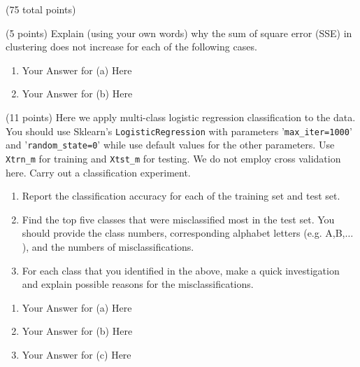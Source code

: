 \documentclass[12pt]{article}
\begin{document}
\begin{question}{(75 total points) \qTwoTitle}
\begin{subquestion}{(5 points)
    Explain (using your own words) why the sum of square error (SSE) in \kmeans clustering does not increase for each of the following cases.
  }
  \begin{answerbox}{0.55\textheight}
    \begin{enumerate}
    \item Your Answer for (a) Here
    \item Your Answer for (b) Here
    \end{enumerate}
  \end{answerbox}
  


\end{subquestion}

\begin{subquestion}{(11 points)
    Here we apply multi-class logistic regression classification to the data. You should use Sklearn's {\tt LogisticRegression} with parameters '{\tt max\_iter=1000}' and '{\tt random\_state=0}' while use default values for the other parameters.
    Use {\tt Xtrn\_m} for training and {\tt Xtst\_m} for testing. We do not employ cross validation here.
    Carry out a classification experiment.
  }\label{q2:LR}
  \begin{enumerate}\NARROWITEM
  \item Report the classification accuracy for each of the training set and test set. 
  \item Find the top five classes that were misclassified most in the test set. You should provide the class numbers, corresponding alphabet letters (e.g. A,B,$\ldots$), and the numbers of misclassifications.
  \item For each class that you identified in the above, make a quick investigation and explain possible reasons for the misclassifications.
  \end{enumerate}
   

  \begin{answerbox}{0.7\textheight}
    \begin{enumerate}
    \item Your Answer for (a) Here
    \item Your Answer for (b) Here
    \item Your Answer for (c) Here
    \end{enumerate}
  \end{answerbox}
  


\end{subquestion}


\end{question}
\end{document}
